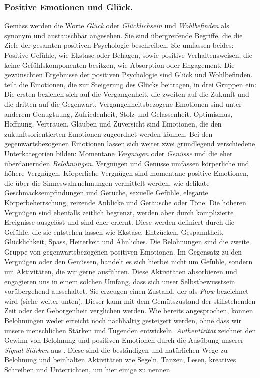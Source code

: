 \subsubsection{Positive Emotionen und Glück.} 
Gemäss  werden die Worte \textit{Glück} oder \textit{Glücklichsein} und \textit{Wohlbefinden} als synonym und austauschbar angesehen. Sie sind übergreifende Begriffe, die die Ziele der gesamten positiven Psychologie beschreiben. Sie umfassen beides: Positive Gefühle, wie Ekstase oder Behagen, sowie positive Verhaltensweisen, die keine Gefühlskomponenten besitzen, wie Absorption oder Engagement. Die gewünschten Ergebnisse der positiven Psychologie sind Glück und Wohlbefinden.\\
 teilt die Emotionen, die zur Steigerung des Glücks beitragen, in drei Gruppen ein: Die ersten beziehen sich auf die Vergangenheit, die zweiten auf die Zukunft und die dritten auf die Gegenwart. Vergangenheitsbezogene Emotionen sind unter anderem Genugtuung, Zufriedenheit, Stolz und Gelassenheit. Optimismus, Hoffnung, Vertrauen, Glauben und Zuversicht sind Emotionen, die den zukunftsorientierten Emotionen zugeordnet werden können. Bei den gegenwartsbezogenen Emotionen lassen sich weiter zwei grundlegend verschiedene Unterkategorien bilden: Momentane \textit{Vergnügen} oder \textit{Genüsse} und die eher überdauernden \textit{Belohnungen}. Vergnügen und Genüsse umfassen körperliche und höhere Vergnügen. Körperliche Vergnügen sind momentane positive Emotionen, die über die Sinneswahrnehmungen vermittelt werden, wie delikate Geschmacksempfindungen und Gerüche, sexuelle Gefühle, elegante Körperbeherrschung, reizende Anblicke und Geräusche oder Töne. Die höheren Vergnügen sind ebenfalls zeitlich begrenzt, werden aber durch komplizierte Ereignisse ausgelöst und sind eher erlernt. Diese werden definiert durch die Gefühle, die sie entstehen lassen wie Ekstase, Entzücken, Gespanntheit, Glücklichkeit, Spass, Heiterkeit und Ähnliches. Die Belohnungen sind die zweite Gruppe von gegenwartsbezogenen positiven Emotionen. Im Gegensatz zu den Vergnügen oder den Genüssen, handelt es sich hierbei nicht um Gefühle, sondern um Aktivitäten, die wir gerne ausführen. Diese Aktivitäten absorbieren und engagieren uns in einem solchen Umfang, dass sich unser Selbstbewusstsein vorübergehend ausschaltet. Sie erzeugen einen Zustand, der als \textit{Flow} bezeichnet wird (siehe weiter unten). Dieser kann mit dem Gemütszustand der stillstehenden Zeit oder der Geborgenheit verglichen werden. Wie bereits angesprochen, können Belohnungen weder erreicht noch nachhaltig gesteigert werden, ohne dass wir unsere menschlichen Stärken und Tugenden entwickeln. \textit{Authentizität} zeichnet den Gewinn von Belohnung und positiven Emotionen durch die Ausübung unserer \textit{Signal-Stärken} aus \cite{Seligman2003}. Diese sind die beständigen und natürlichen Wege zu Belohnung und beinhalten Aktivitäten wie Segeln, Tanzen, Lesen, kreatives Schreiben und Unterrichten, um hier einige zu nennen.

